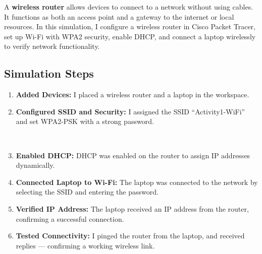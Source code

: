\documentclass[11pt,a4paper]{article}
\let\oldincludegraphics\includegraphics
\renewcommand{\includegraphics}[2][]{%
  \begin{center}
    \oldincludegraphics[#1]{#2}
  \end{center}
}
\begin{document}
A \textbf{wireless router} allows devices to connect to a network without using cables. It functions as both an access point and a gateway to the internet or local resources. In this simulation, I configure a wireless router in Cisco Packet Tracer, set up Wi-Fi with WPA2 security, enable DHCP, and connect a laptop wirelessly to verify network functionality.

\subsection{Simulation Steps}

\begin{enumerate}
\item \textbf{Added Devices:} I placed a wireless router and a laptop in the workspace.


\item \textbf{Configured SSID and Security:} I assigned the SSID “Activity1-WiFi” and set WPA2-PSK with a strong password.

 \\[1em]

\item \textbf{Enabled DHCP:} DHCP was enabled on the router to assign IP addresses dynamically.


\item \textbf{Connected Laptop to Wi-Fi:} The laptop was connected to the network by selecting the SSID and entering the password.


\item \textbf{Verified IP Address:} The laptop received an IP address from the router, confirming a successful connection.


\item \textbf{Tested Connectivity:} I pinged the router from the laptop, and received replies — confirming a working wireless link.

\end{enumerate}
\end{document}
